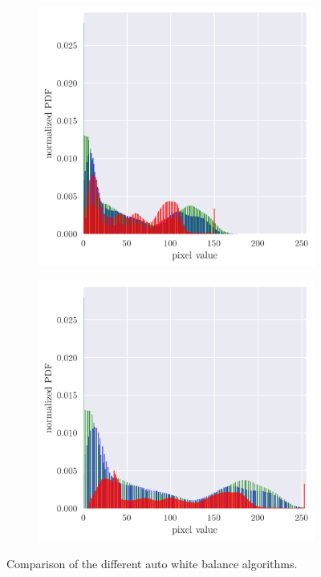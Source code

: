 \documentclass[12pt,a4paper]{article}
\begin{document}
\begin{figure}[htb]
\begin{subfigure}[h!]{0.3\textwidth}
		\includegraphics[width=\textwidth]{gw_hist.png}
		\caption{}
		\label{fig:gw-hist-com}
	\end{subfigure}
		\begin{subfigure}[h!]{0.3\textwidth}
		\centering
		\includegraphics[width=\textwidth]{awbaaet_hist.png}
		\caption{}
		\label{fig:awbaaet-hist}
	\end{subfigure}
	
	\caption{Comparison of the different auto white balance algorithms.}
	\label{fig:comparisons}
\end{figure}
\end{document}
